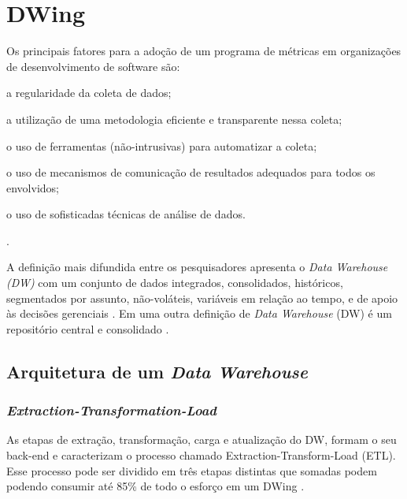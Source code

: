 \chapter{DWing}

Os principais fatores para a adoção de um programa de métricas em organizações 
de desenvolvimento de software são:
\begin{inparaenum}[i)]
\item a regularidade da coleta de dados;
\item a utilização de uma metodologia eficiente e transparente nessa coleta; 
\item o uso de ferramentas (não-intrusivas) para automatizar a coleta;
\item o uso de mecanismos de comunicação de resultados adequados para todos os 
envolvidos;
\item o uso de sofisticadas técnicas de análise de dados. 
\end{inparaenum}
\cite{Gopal2005} \cite{Silveira2010}.



A definição mais difundida entre os pesquisadores apresenta o \textit{Data 
Warehouse (DW)} com um conjunto de dados integrados, consolidados, históricos, 
segmentados por assunto, não-voláteis, variáveis em relação ao tempo, e de 
apoio às decisões gerenciais \cite{Inmon1992}. Em uma outra definição de 
\textit{Data Warehouse} (DW) é um repositório central e consolidado 
\cite{Kimball2002}.


	
\section{Arquitetura de um \textit{Data Warehouse}} 
\subsection{\textit{Extraction-Transformation-Load}}

As etapas de extração, transformação, carga e atualização do DW, formam o seu
back-end e caracterizam o processo chamado Extraction-Transform-Load (ETL). 
Esse processo pode ser dividido em três etapas distintas que somadas podem 
podendo consumir até 85\% de todo o esforço em um DWing \cite{Kimball2002}.

